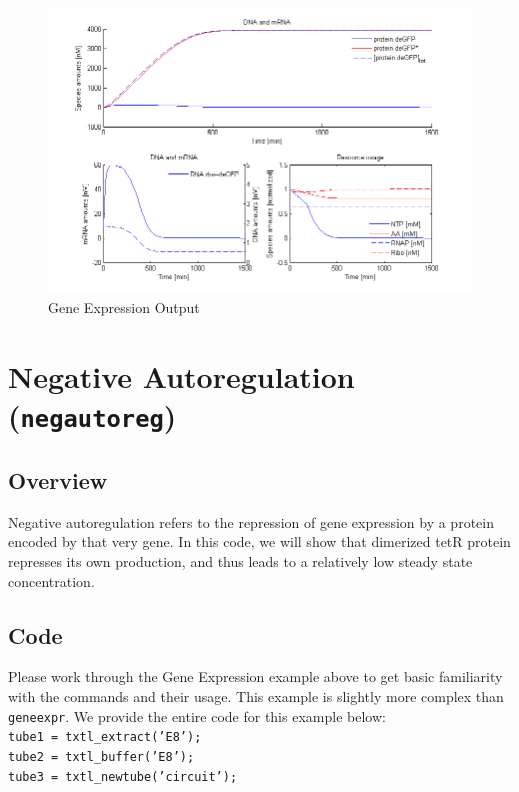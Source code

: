 \documentclass[english]{report}
\begin{document}
		
		
		\begin{figure}
		\begin{center}
		\includegraphics[width=\textwidth]{GeneExpressionPlotActuallyProducedByCode.png} 
		\caption{Gene Expression Output}
		\label{fig:geneexpr}
		\end{center}
		
		\end{figure}
		
	\section{Negative Autoregulation (\texttt{negautoreg})}
		\subsection{Overview}
		Negative autoregulation refers to the repression of gene expression by a protein encoded by that very gene. In this code, we will show that dimerized tetR protein represses its own production, and thus leads to a relatively low steady state concentration. 
		\subsection{Code}
		Please work through the Gene Expression example above to get basic familiarity with the commands and their usage. This example is slightly more complex than \texttt{geneexpr}. We provide the entire code for this example below: \\
		
		\noindent \texttt{tube1 = txtl\_extract('E8');} \\
								\texttt{tube2 = txtl\_buffer('E8');} \\
								\texttt{tube3 = txtl\_newtube('circuit');} 
								\vspace*{1\baselineskip}
								
\end{document}
